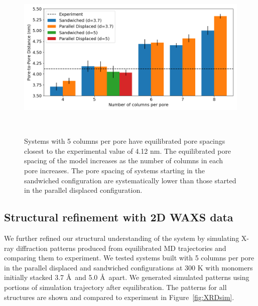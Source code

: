 \documentclass[journal=jpcbfk,manusciprt=article]{achemso}
\begin{document}
  \begin{figure}
	\centering
	\includegraphics[width=\linewidth]{p2p.png}
	\caption{Systems with 5 columns per pore have equilibrated pore spacings closest to
			 the experimental value of 4.12 nm. The equilibrated pore spacing of the model 	
			 increases as the number of columns in each pore increases. The pore spacing
			 of systems starting in the sandwiched configuration are systematically lower
			 than those started in the parallel displaced configuration.}~\label{fig:p2p}
  \end{figure}  

  \subsection{Structural refinement with 2D WAXS data}
  
  We further refined our structural understanding of the system by simulating X-ray 
  diffraction patterns produced from equilibrated MD trajectories and comparing them
  to experiment. We tested systems built with 5 columns per pore in the parallel 
  displaced and sandwiched configurations at 300 K with monomers initially stacked
  3.7 \AA~and 5.0 \AA~apart. We generated simulated patterns using portions
  of simulation trajectory after equilibration. The patterns for all structures are
  shown and compared to experiment in Figure~\ref{fig:XRDsim}.
\end{document}
